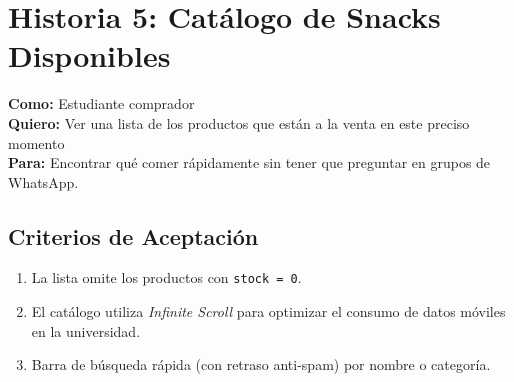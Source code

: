 \documentclass[11pt, letterpaper]{article}
\begin{document}
    \section{Historia 5: Catálogo de Snacks Disponibles}

    \begin{tcolorbox}[colback=orange!5!white,colframe=orange!75!black,title=HU-05: Búsqueda en Tiempo Real]
        \textbf{Como:} Estudiante comprador \\
        \textbf{Quiero:} Ver una lista de los productos que están a la venta en este preciso momento \\
        \textbf{Para:} Encontrar qué comer rápidamente sin tener que preguntar en grupos de WhatsApp.
    \end{tcolorbox}

    \subsection{Criterios de Aceptación}
    \begin{enumerate}[label=\bfseries\arabic*.]
        \item La lista omite los productos con \texttt{stock = 0}.
        \item El catálogo utiliza \textit{Infinite Scroll} para optimizar el consumo de datos móviles en la universidad.
        \item Barra de búsqueda rápida (con retraso anti-spam) por nombre o categoría.
    \end{enumerate}
\end{document}
